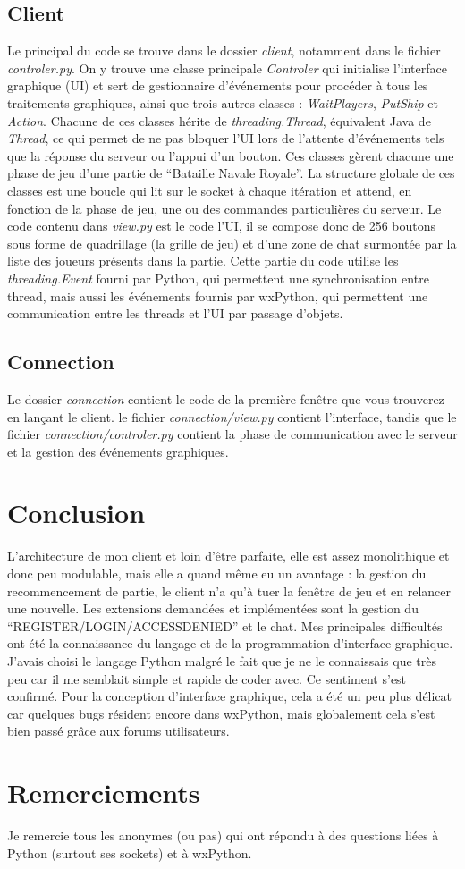 \documentclass[a4paper, 11pt]{report}
\begin{document}
\subsection{Client}
Le principal du code se trouve dans le dossier \emph{client}, notamment dans le fichier \emph{controler.py}.
On y trouve une classe principale \emph{Controler} qui initialise l'interface graphique (UI) et sert de gestionnaire d'événements pour procéder à tous les traitements graphiques,
ainsi que trois autres classes :
\emph{WaitPlayers}, \emph{PutShip} et \emph{Action}. Chacune de ces classes hérite de \emph{threading.Thread}, équivalent Java de
\emph{Thread}, ce qui permet de ne pas bloquer l'UI lors de l'attente d'événements tels que la réponse du serveur ou l'appui d'un bouton.
Ces classes gèrent chacune une phase de jeu d'une partie de ``Bataille Navale Royale''.
La structure globale de ces classes est une boucle qui lit sur le socket à chaque itération et attend, en fonction de la phase de jeu, une ou des commandes particulières du serveur.
\newline
Le code contenu dans \emph{view.py} est le code l'UI, il se compose donc de 256 boutons sous forme de quadrillage (la grille de jeu) et d'une zone de chat surmontée par la liste
des joueurs présents dans la partie.
\newline
Cette partie du code utilise les \emph{threading.Event} fourni par Python, qui permettent une synchronisation entre thread, mais aussi les
événements fournis par wxPython, qui permettent une communication entre les threads et l'UI par passage d'objets.

\subsection{Connection}
Le dossier \emph{connection} contient le code de la première fenêtre que vous trouverez en lançant le client.
le fichier \emph{connection/view.py} contient l'interface, tandis que le fichier \emph{connection/controler.py} contient
la phase de communication avec le serveur et la gestion des événements graphiques.

\section{Conclusion}
L'architecture de mon client et loin d'être parfaite, elle est assez monolithique et donc peu modulable, mais elle a quand même eu un avantage :
la gestion du recommencement de partie, le client n'a qu'à tuer la fenêtre de jeu et en relancer une nouvelle.
Les extensions demandées et implémentées sont la gestion du ``REGISTER/LOGIN/ACCESSDENIED'' et le chat.
\newline
Mes principales difficultés ont été la connaissance du langage et de la programmation d'interface graphique.
J'avais choisi le langage Python malgré le fait que je ne le connaissais que très peu car il me semblait simple et rapide de coder avec.
Ce sentiment s'est confirmé. Pour la conception d'interface graphique, cela a été un peu plus délicat car quelques bugs résident encore dans
wxPython, mais globalement cela s'est bien passé grâce aux forums utilisateurs.

\section{Remerciements}
Je remercie tous les anonymes (ou pas) qui ont répondu à des questions liées à Python (surtout ses sockets) et à wxPython.
\end{document}
